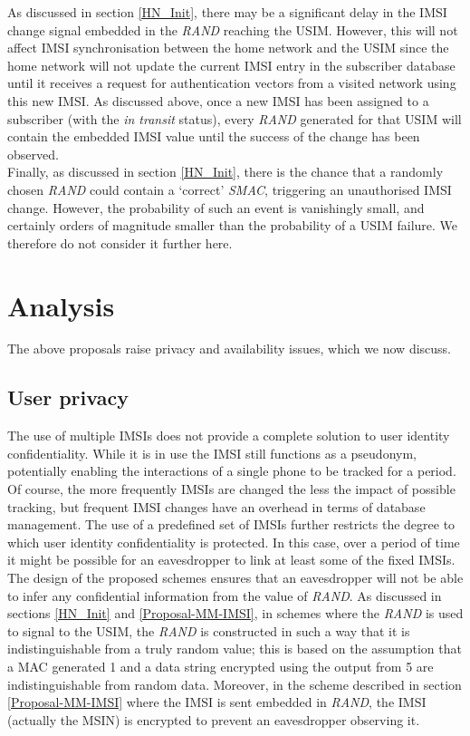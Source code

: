 \documentclass{acm_proc_article-sp}
\begin{document}
As discussed in section \ref{HN_Init}, there may be a significant delay in the IMSI change signal embedded in the \emph{RAND} reaching the USIM. However, this will not affect IMSI synchronisation between the home network and the USIM since the home network will not update the current IMSI entry in the subscriber database until it receives a request for authentication vectors from a visited network using this new IMSI. As discussed above, once a new IMSI has been assigned to a subscriber (with the \emph{in transit} status), every \emph{RAND} generated for that USIM will contain the embedded IMSI value until the success of the change has been observed. \\

Finally, as discussed in section \ref{HN_Init}, there is the chance that a randomly chosen \emph{RAND} could contain a `correct' \emph{SMAC}, triggering an unauthorised IMSI change. However, the probability of such an event is vanishingly small, and certainly orders of magnitude smaller than the probability of a USIM failure. We therefore do not consider it further here.

\section{Analysis} \label{analysis}

The above proposals raise privacy and availability issues, which we now discuss.

\subsection{User privacy} \label{user-privacy}

The use of multiple IMSIs does not provide a complete solution to user identity confidentiality. While it is in use the IMSI still functions as a pseudonym, potentially enabling the interactions of a single phone to be tracked for a period. Of course, the more frequently IMSIs are changed the less the impact of possible tracking, but frequent IMSI changes have an overhead in terms of database management. The use of a predefined set of IMSIs further restricts the degree to which user identity confidentiality is protected. In this case, over a period of time it might be possible for an eavesdropper to link at least some of the fixed IMSIs.  \\

The design of the proposed schemes ensures that an eavesdropper will not be able to infer any confidential information from the value of \emph{RAND}\@. As discussed in sections \ref{HN_Init} and \ref{Proposal-MM-IMSI}, in schemes where the \emph{RAND} is used to signal to the USIM, the \emph{RAND} is constructed in such a way that it is indistinguishable from a truly random value; this is based on the assumption that a MAC generated 1 and a data string encrypted using the output from 5 are indistinguishable from random data. Moreover, in the scheme described in section \ref{Proposal-MM-IMSI} where the IMSI is sent embedded in \emph{RAND}\@, the IMSI (actually the MSIN) is encrypted to prevent an eavesdropper observing it.    \\
\end{document}
